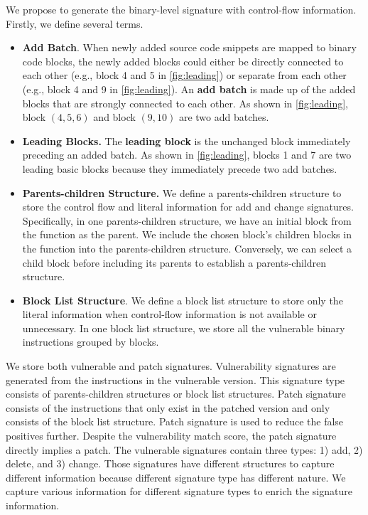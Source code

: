 We propose to generate the binary-level signature with control-flow information. 
Firstly, we define several terms. 
\begin{itemize}
   \item \textbf{Add Batch}. When newly added source code snippets are mapped to binary code blocks, the newly added blocks could either be directly connected to each other (e.g., block 4 and 5 in \autoref{fig:leading}) or separate from each other (e.g., block 4 and 9 in \autoref{fig:leading}).
   An \textbf{add batch} is made up of the added blocks that are strongly connected to each other.
   As shown in \autoref{fig:leading}, block $(4, 5, 6)$ and block $(9, 10)$ are two add batches.
   \item \textbf{Leading Blocks.} 
   The \textbf{leading block} is the unchanged block immediately preceding an added batch.
   As shown in \autoref{fig:leading}, blocks 1 and 7 are two leading basic blocks because they immediately precede two add batches.
   \item \textbf{Parents-children Structure.} We define a parents-children structure to store the control flow and literal information for add and change signatures. 
   Specifically, in one parents-children structure, we have an initial block from the function as the parent. 
   We include the chosen block's children blocks in the function into the parents-children structure. 
   Conversely, we can select a child block before including its parents to establish a parents-children structure.
   \item \textbf{Block List Structure}. We define a block list structure to store only the literal information when control-flow information is not available or unnecessary. 
   In one block list structure, we store all the vulnerable binary instructions grouped by blocks.
\end{itemize}


We store both vulnerable and patch signatures. 
Vulnerability signatures are generated from the instructions in the vulnerable version. 
This signature type consists of parents-children structures or block list structures. 
Patch signature consists of the instructions that only exist in the patched version and only consists of the block list structure. 
Patch signature is used to reduce the false positives further. 
Despite the vulnerability match score, the patch signature directly implies a patch. 
The vulnerable signatures contain three types: 1) add, 2) delete, and 3) change.
Those signatures have different structures to capture different information because different signature type has different nature. 
We capture various information for different signature types to enrich the signature information.


